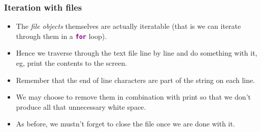 \documentclass[xcolor=svgnames]{beamer}
\newcommand{\nl}{\\[1em]}
\newcommand{\command}[1]{\texttt{\textbf{\textcolor{DarkMagenta}{#1}}}}
\newcommand{\ft}[1]{\frametitle{#1}}
\begin{document}
%



\begin{frame}\ft{Iteration with files}
\begin{itemize}
\item The \emph{file objects} themselves are actually iteratable (that is we can iterate through them in a \command{for} loop).\nl
\item Hence we traverse through the text file line by line and do something with it, eg, print the contents to the screen.\nl
\item Remember that the end of line characters are part of the string on each line. \nl
\item We may choose to remove them in combination with print so that we don't produce all that unnecessary white space.  \nl
\item As before, we mustn't forget to close the file once we are done with it.\nl
\end{itemize}
\end{frame}
\end{document}
